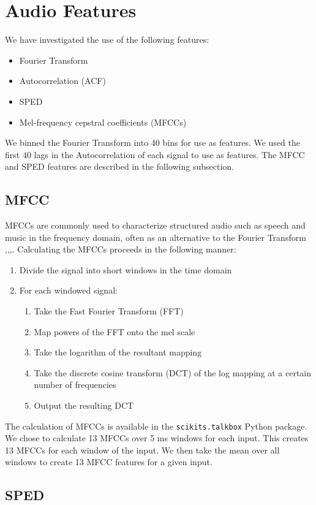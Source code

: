 \documentclass[journal]{IEEEtran}
\begin{document}
\section{Audio Features}
We have investigated the use of the following features:
\begin{itemize}
\item Fourier Transform
\item Autocorrelation (ACF)
\item SPED
\item Mel-frequency cepstral coefficients (MFCCs)
\end{itemize}
We binned the Fourier Transform into 40 bins for use as features. We used the first 40 lags in the Autocorrelation of each signal to use as features. The MFCC and SPED features are described in the following subsection.

\subsection{MFCC}
MFCCs are commonly used to characterize structured audio such as speech and music in the frequency domain, often as an alternative to the Fourier Transform \cite{Chu},\cite{Chu2Env},\cite{guo2003content},\cite{aucouturier2007bag}. Calculating the MFCCs proceeds in the following manner\cite{rabiner1993fundamentals}:
\begin{enumerate}
\item Divide the signal into short windows in the time domain
\item For each windowed signal:
    \begin{enumerate}
    \item Take the Fast Fourier Transform (FFT)
    \item Map powers of the FFT onto the mel scale
    \item Take the logarithm of the resultant mapping
    \item Take the discrete cosine transform (DCT) of the log mapping at a certain number of frequencies
    \item Output the resulting DCT
    \end{enumerate}
\end{enumerate} 
The calculation of MFCCs is available in the \texttt{scikits.talkbox} Python package. We chose to calculate 13 MFCCs over 5 ms windows for each input. This creates 13 MFCCs for each window of the input. We then take the mean over all windows to create 13 MFCC features for a given input.
\subsection{SPED}
\end{document}
